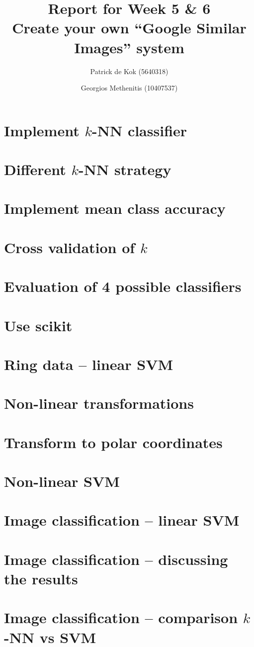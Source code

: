 \documentclass[a4paper,10pt,twoside]{article}
\title{Report for Week 5 \& 6\\\normalsize Create your own ``Google Similar Images'' system}
\author{Patrick de Kok (5640318) \and Georgios Methenitis (10407537)}
\begin{document}
\maketitle
\thispagestyle{empty}

\section{Implement $k$-NN classifier}

\section{Different $k$-NN strategy}

\section{Implement mean class accuracy}

\section{Cross validation of $k$}

\section{Evaluation of 4 possible classifiers}

\section{Use scikit}

\section{Ring data -- linear SVM}

\section{Non-linear transformations}

\section{Transform to polar coordinates}

\section{Non-linear SVM}

\section{Image classification -- linear SVM}

\section{Image classification -- discussing the results}

\section{Image classification -- comparison $k$-NN vs SVM}


%
%
\end{document}
